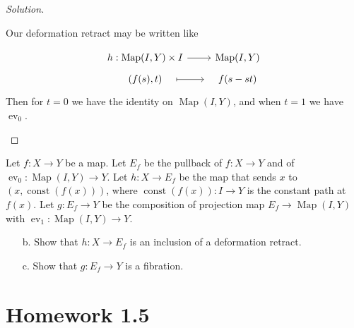 \documentclass{article}
\numberwithin{equation}{section}
\DeclareMathOperator{\Map}{Map}
\DeclareMathOperator{\ev}{ev}
\begin{document}
\begin{proof}[Solution]
\begin{enumerate}[label*=\alph*.]
		Our deformation retract may be written like
		\iffalse\[\begin{tikzcd}[row sep=tiny]
			h:\Map(I,Y) \arrow[r]&\Map(I,\Map(I,Y))\\
			f(s)\arrow[r,maps to,shorten=2em]&t\mapsto f(s-st)
		\end{tikzcd}\]\fi
		\[\begin{tikzcd}[row sep=tiny]
			h:\Map(I,Y)\times I \arrow[r]&\Map(I,Y)\\
			(f(s),t)\arrow[r,maps to,shorten=1em]&f(s-st)
		\end{tikzcd}\]
		Then for $t=0$ we have the identity on $\Map(I,Y)$, and when $t=1$ we have $\ev_0$.
	\end{enumerate}
\end{proof}

Let $f : X \to Y$ be a map. Let $E_f$ be the pullback of $f : X \to Y$ and of $\ev_0 :\Map(I,Y)\to Y$. Let $h:X\to E_f$ be the map that sends $x$ to $(x,\operatorname{const}(f(x)))$, where $\operatorname{const}(f(x)) : I \to Y$ is the constant path at $f(x)$. Let $g : E_f \to Y$ be the composition of projection map $E_f \to \Map(I,Y)$ with $\ev_1 :\Map(I,Y)\to Y$.
\begin{exercise}
	\begin{enumerate}
		\item[b.] Show that $h:X\to E_{f}$ is an inclusion of a deformation retract.
		\item[c.] Show that $g:E_{f}\to Y$ is a fibration.
	\end{enumerate}
	
\end{exercise}


\section{Homework 1.5}
\end{document}
